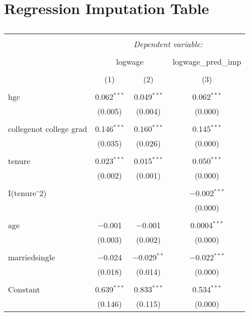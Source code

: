 \documentclass{article}
\begin{document}
\section{Regression Imputation Table}
\begin{table}[!htbp] \centering 
  \caption{} 
  \label{} 
\begin{tabular}{@{\extracolsep{5pt}}lccc} 
\\[-1.8ex]\hline 
\hline \\[-1.8ex] 
 & \multicolumn{3}{c}{\textit{Dependent variable:}} \\ 
\cline{2-4} 
\\[-1.8ex] & \multicolumn{2}{c}{logwage} & logwage\_pred\_imp \\ 
\\[-1.8ex] & (1) & (2) & (3)\\ 
\hline \\[-1.8ex] 
 hgc & 0.062$^{***}$ & 0.049$^{***}$ & 0.062$^{***}$ \\ 
  & (0.005) & (0.004) & (0.000) \\ 
  & & & \\ 
 collegenot college grad & 0.146$^{***}$ & 0.160$^{***}$ & 0.145$^{***}$ \\ 
  & (0.035) & (0.026) & (0.000) \\ 
  & & & \\ 
 tenure & 0.023$^{***}$ & 0.015$^{***}$ & 0.050$^{***}$ \\ 
  & (0.002) & (0.001) & (0.000) \\ 
  & & & \\ 
 I(tenure$\hat{\mkern6mu}$2) &  &  & $-$0.002$^{***}$ \\ 
  &  &  & (0.000) \\ 
  & & & \\ 
 age & $-$0.001 & $-$0.001 & 0.0004$^{***}$ \\ 
  & (0.003) & (0.002) & (0.000) \\ 
  & & & \\ 
 marriedsingle & $-$0.024 & $-$0.029$^{**}$ & $-$0.022$^{***}$ \\ 
  & (0.018) & (0.014) & (0.000) \\ 
  & & & \\ 
 Constant & 0.639$^{***}$ & 0.833$^{***}$ & 0.534$^{***}$ \\ 
  & (0.146) & (0.115) & (0.000) \\ 

\end{tabular}
\end{table}
\end{document}
